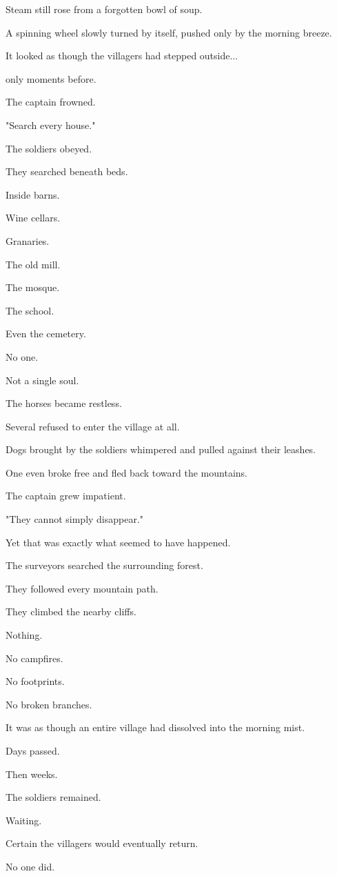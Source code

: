 \documentclass[12pt,openany]{book}
\begin{document}
Steam still rose from a forgotten bowl of soup.

A spinning wheel slowly turned by itself, pushed only by the morning breeze.

It looked as though the villagers had stepped outside...

only moments before.

The captain frowned.

"Search every house."

The soldiers obeyed.

They searched beneath beds.

Inside barns.

Wine cellars.

Granaries.

The old mill.

The mosque.

The school.

Even the cemetery.

No one.

Not a single soul.

The horses became restless.

Several refused to enter the village at all.

Dogs brought by the soldiers whimpered and pulled against their leashes.

One even broke free and fled back toward the mountains.

The captain grew impatient.

"They cannot simply disappear."

Yet that was exactly what seemed to have happened.

The surveyors searched the surrounding forest.

They followed every mountain path.

They climbed the nearby cliffs.

Nothing.

No campfires.

No footprints.

No broken branches.

It was as though an entire village had dissolved into the morning mist.

Days passed.

Then weeks.

The soldiers remained.

Waiting.

Certain the villagers would eventually return.

No one did.
\end{document}

